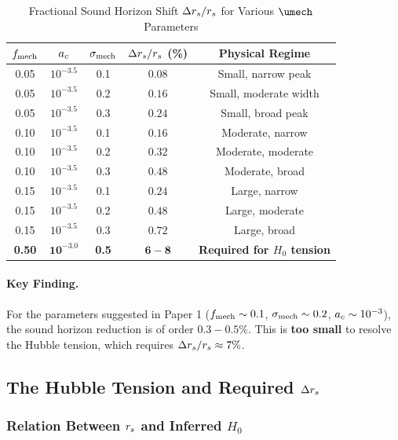 \begin{table}[H]
\centering
\caption{Fractional Sound Horizon Shift $\Delta r_s/r_s$ for Various $\umech$ Parameters}
\label{tab:Deltars_values}
\begin{tabular}{@{}ccc|c|c@{}}
\toprule
$f_{\mathrm{mech}}$ & $a_c$ & $\sigma_{\mathrm{mech}}$ & $\Delta r_s/r_s$ (\%) & Physical Regime \\
\midrule
0.05 & $10^{-3.5}$ & 0.1 & $0.08$ & Small, narrow peak \\
0.05 & $10^{-3.5}$ & 0.2 & $0.16$ & Small, moderate width \\
0.05 & $10^{-3.5}$ & 0.3 & $0.24$ & Small, broad peak \\
\midrule
0.10 & $10^{-3.5}$ & 0.1 & $0.16$ & Moderate, narrow \\
0.10 & $10^{-3.5}$ & 0.2 & $0.32$ & Moderate, moderate \\
0.10 & $10^{-3.5}$ & 0.3 & $0.48$ & Moderate, broad \\
\midrule
0.15 & $10^{-3.5}$ & 0.1 & $0.24$ & Large, narrow \\
0.15 & $10^{-3.5}$ & 0.2 & $0.48$ & Large, moderate \\
0.15 & $10^{-3.5}$ & 0.3 & $0.72$ & Large, broad \\
\midrule
\textbf{0.50} & $\mathbf{10^{-3.0}}$ & \textbf{0.5} & $\mathbf{6-8}$ & \textbf{Required for $H_0$ tension} \\
\bottomrule
\end{tabular}
\end{table}

\paragraph{Key Finding.} For the parameters suggested in Paper 1 ($f_{\mathrm{mech}} \sim 0.1$, $\sigma_{\mathrm{mech}} \sim 0.2$, $a_c \sim 10^{-3}$), the sound horizon reduction is of order $0.3-0.5\%$. This is \textbf{too small} to resolve the Hubble tension, which requires $\Delta r_s/r_s \approx 7\%$.

\subsection{The Hubble Tension and Required $\Delta r_s$}
\label{sec:H0_tension}

\subsubsection{Relation Between $r_s$ and Inferred $H_0$}

